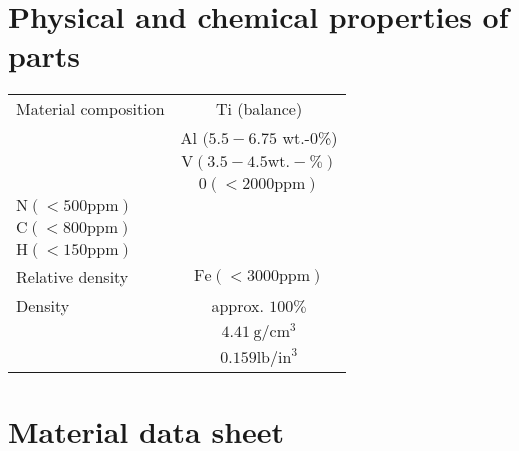 \documentclass[10pt]{article}
\begin{document}
\section*{Physical and chemical properties of parts}
\begin{center}
\begin{tabular}{lc}
Material composition & Ti (balance) \\
 & Al $(5.5-6.75$ wt.-0\%) \\
 & $\mathrm{V}(3.5-4.5 \mathrm{wt} .-\%)$ \\
 & $0(<2000 \mathrm{ppm})$ \\
$\mathrm{N}(<500 \mathrm{ppm})$ &  \\
$\mathrm{C}(<800 \mathrm{ppm})$ &  \\
$\mathrm{H}(<150 \mathrm{ppm})$ &  \\
Relative density & $\mathrm{Fe}(<3000 \mathrm{ppm})$ \\
\hline
Density & approx. $100 \%$ \\
 & $4.41 \mathrm{~g} / \mathrm{cm}^{3}$ \\
 & $0.159 \mathrm{lb} / \mathrm{in}^{3}$ \\
\hline
\end{tabular}
\end{center}

\section*{Material data sheet}
\end{document}
